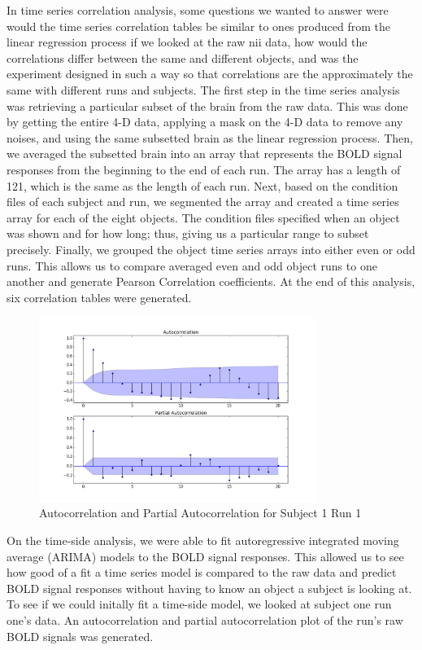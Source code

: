 \documentclass[11pt,twocolumn]{article}
\begin{document}
In time series correlation analysis, some questions we wanted to answer were
would the time series correlation tables be similar to ones produced from
the linear regression process if we looked at the raw nii data, how would
the correlations differ between the same and different objects, and was the
experiment designed in such a way so that correlations are the approximately
the same with different runs and subjects. The first step in the time series
analysis was retrieving a particular subset of the brain from the raw data.
This was done by getting the entire 4-D data, applying a mask on the 4-D data
to remove any noises, and using the same subsetted brain as the linear
regression process. Then, we averaged the subsetted brain into an array that
represents the BOLD signal responses from the beginning to the end of each run.
The array has a length of 121, which is the same as the length of each run.
Next, based on the condition files of each subject and run, we segmented the
array and created a time series array for each of the eight objects. The
condition files specified when an object was shown and for how long; thus,
giving us a particular range to subset precisely. Finally, we grouped the
object time series arrays into either even or odd runs. This allows us to
compare averaged even and odd object runs to one another and generate
Pearson Correlation coefficients. At the end of this analysis, six correlation
tables were generated.

\begin{figure}[h!]                                                              
\centering                                                                      
\includegraphics[width=90mm]{sub001_run001_corrFunc.png}                   
\caption{Autocorrelation and Partial Autocorrelation for Subject 1 Run 1}                                    
\end{figure}


On the time-side analysis, we were able to fit autoregressive integrated
moving average (ARIMA) models to the BOLD signal responses. This allowed us to
see how good of a fit a time series model is compared to the raw data and 
predict BOLD signal responses without having to know an object a subject is 
looking at. To see if we could initally fit a time-side model, we looked at
subject one run one's data. An autocorrelation and partial autocorrelation 
plot of the run's raw BOLD signals was generated. 
\end{document}
